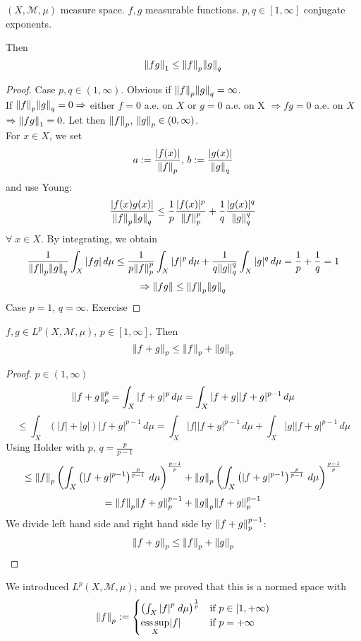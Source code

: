 \begin{theorem}
    \(\left(X, \mathcal{M}, \mu \right)\) measure space. \(f, g\) measurable functions. \(p, q \in [1, \infty]\) conjugate exponents.

    Then 
    \[
        \norm{fg}_1 \leq \norm{f}_p \norm{g}_q
    \]
\end{theorem}
\begin{proof}
    Case \(p, q \in (1, \infty)\). Obvious if \(\norm{f}_p \norm{g}_q = \infty\). \\
    If \(\norm{f}_p \norm{g}_q = 0 \Rightarrow\)  either \(f=0\) a.e. on \(X\) or \(g=0\) a.e. on X
    \(\Rightarrow fg=0\) a.e. on \(X\) \(\Rightarrow \norm{fg}_1 =0\). Let then \(\norm{f}_p\), \(\norm{g}_p \in (0, \infty)\). \\
    For \(x \in X\), we set 
    \[
        a := \frac{|f(x)|}{\norm{f}_p} \text{, } b := \frac{|g(x)|}{\norm{g}_q} 
    \]
    and use Young:
    \[
        \frac{|f(x)g(x)|}{\norm{f}_p \norm{g}_q} 
        \leq \frac{1}{p} \frac{|f(x)|^p}{\norm{f}_p^p} + \frac{1}{q} \frac{|g(x)|^q}{\norm{g}_q^q}
    \]
    \(\forall \; x \in X \). By integrating, we obtain
    \[
        \frac{1}{\norm{f}_p \norm{g}_q} \int_X |fg| \, d\mu \leq 
        \frac{1}{p \norm{f}_p^p} \int_X |f|^p \, d\mu + \frac{1}{q \norm{g}_q^q} \int_X |g|^q \, d\mu 
        = \frac{1}{p} + \frac{1}{q} = 1
    \]
    \[
        \Rightarrow \norm{fg} \leq \norm{f}_p \norm{g}_q
    \]
    Case \(p=1\), \(q= \infty\). Exercise 
\end{proof}
\begin{theorem}
    \(f, g \in L^p(X, \mathcal{M}, \mu)\), \(p \in [1, \infty]\). Then 
    \[
        \norm{f+g}_p \leq \norm{f}_p + \norm{g}_p
    \] 
\end{theorem}
\begin{proof}
    \(p \in (1, \infty)\)
    \[
        \norm{f+g}_p^p = \int_X |f+g|^p \, d\mu = \int_X |f+g| |f+g|^{p-1} \, d\mu
    \]
    \[    
        \leq \int_X \left( |f|+|g| \right) |f+g|^{p-1} \, d\mu
        = \int_X |f| |f+g|^{p-1} \, d\mu + \int_X |g| |f+g|^{p-1} \, d\mu 
    \]
    Using Holder with \(p\), \(q = \frac{p}{p-1}\)
    \[
        \leq \norm{f}_p \left( \int_X \left( |f+g|^{p-1} \right)^{\frac{p}{p-1}} \, d\mu \right) ^ {\frac{p-1}{p}}
        + \norm{g}_p \left( \int_X \left( |f+g|^{p-1} \right)^{\frac{p}{p-1}} \, d\mu \right) ^ {\frac{p-1}{p}}
    \]
    \[
        = \norm{f}_p \norm{f+g}^{p-1}_p + \norm{g}_p \norm{f+g}_p^{p-1}
    \]
    We divide left hand side and right hand side by \(\norm{f+g}_p^{p-1}\):
    \[
        \norm{f+g}_p \leq \norm{f}_p + \norm{g}_p
    \]
\end{proof}
We introduced \(L^p(X, \mathcal{M}, \mu)\), and we proved that this is a normed space with 
\[
    \norm{f}_p := \begin{cases}
        \left( \int_X \abs{f}^p \; d\mu \right)^{\frac{1}{p}} & \text{if } p\in [1, +\infty) \\
        \underset{X}{\text{ess}\, \text{sup}}\abs{f} & \text{if } p = +\infty
    \end{cases}
\]
